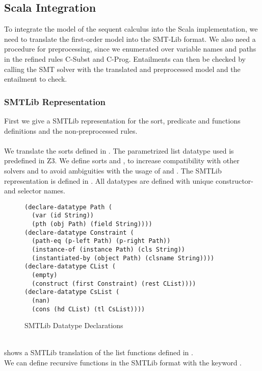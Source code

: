 \subsection{Scala Integration}
To integrate the model of the sequent calculus
into the Scala implementation, we need to translate the
first-order model into the SMT-Lib format.
We also need a procedure for preprocessing,
since we enumerated over variable names and paths
in the refined rules C-Subst and C-Prog.
Entailments can then be checked by calling the SMT solver
with the translated and preprocessed model
and the entailment to check.

\subsubsection{SMTLib Representation}
First we give a SMTLib representation for
the sort, predicate and functions definitions
and the non-preprocessed rules.\\
\\
We translate the sorts defined in .
The parametrized list datatype used is predefined in Z3.
We define sorts  and ,
to increase compatibility with other solvers
and to avoid ambiguities with the usage of \Constrs and \Constrss.
The SMTLib representation is defined in .
All datatypes are defined with unique constructor- and selector names.
%
\begin{figure}[h]
\begin{lstlisting}[language=smtlib]
(declare-datatype Path (
  (var (id String))
  (pth (obj Path) (field String))))
(declare-datatype Constraint (
  (path-eq (p-left Path) (p-right Path))
  (instance-of (instance Path) (cls String))
  (instantiated-by (object Path) (clsname String))))
(declare-datatype CList (
  (empty)
  (construct (first Constraint) (rest CList))))
(declare-datatype CsList (
  (nan)
  (cons (hd CList) (tl CsList))))
\end{lstlisting}
\caption{SMTLib Datatype Declarations}
\label{fig:smtlib-sorts}
\end{figure}\\
%
 shows a SMTLib translation
of the list functions defined in .\\
We can define recursive functions in the SMTLib format
with the keyword .

